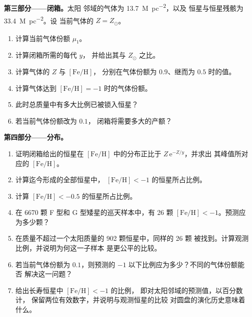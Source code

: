 \begin{problem}
\medskip\noindent\textbf{第三部分——闭箱。}太阳
邻域的气体为 \qty{13.7}{M_\odot.pc^{-2}}，以及
恒星与恒星残骸为 \qty{33.4}{M_\odot.pc^{-2}}。设
当前气体的 $Z = Z_\odot$。
\begin{enumerate}[resume]
\item 计算当前气体份额 $\mu_1$。
\item 计算闭箱所需的每代 $y$，
  并给出其与 $Z_\odot$ 之比。
\item 计算气体的 $Z$ 与 $[\mathrm{Fe/H}]$，
  分别在气体份额为 $0.9$、继而为 $0.5$ 时的值。
\item 计算气体达到
  $[\mathrm{Fe/H}] = -1$ 时的气体份额。
\item 此时总质量中有多大比例已被锁入恒星？
\item 若当前气体份额改为 $0.1$，
  闭箱将需要多大的产额？
\end{enumerate}

\medskip\noindent\textbf{第四部分——分布。}
\begin{enumerate}[resume]
\item 证明闭箱给出的恒星在
  $[\mathrm{Fe/H}]$ 中的分布正比于 $Z\,\mathrm{e}^{-Z/y}$，并求出
  其峰值所对应的 $[\mathrm{Fe/H}]$。
\item 计算迄今形成的全部恒星中，
  $[\mathrm{Fe/H}] < -1$ 的恒星所占比例。
\item 计算 $[\mathrm{Fe/H}] < -0.5$ 的恒星所占比例。
\item 在 6670 颗 F 型和 G 型矮星的巡天样本中，有 26 颗
  $[\mathrm{Fe/H}] < -1$。预测应为多少颗？
\item 在质量不超过一个太阳质量的 902 颗恒星中，同样的 26 颗
  被找到。计算观测比例，并说明为何这一子样本
  是更公平的比较。
\item 若当前气体份额为 $0.1$，则预测的
  $-1$ 以下比例应为多少？不同的气体份额能否
  解决这一问题？
\item 给出长寿恒星中 $[\mathrm{Fe/H}] < -1$ 的比例，
  即对太阳邻域的预测值，以百分数计，
  保留两位有效数字，并说明与观测恒星的比较
  对圆盘的演化历史意味着什么。
\end{enumerate}
\end{problem}

